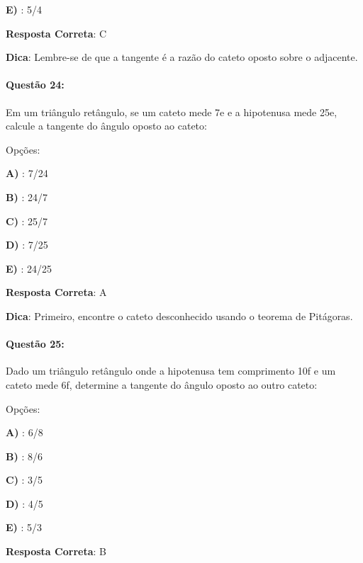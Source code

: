 \documentclass{article}
\begin{document}
\textbf{E) }: 5/4 

\vspace{\baselineskip}\textbf{Resposta Correta}: C

\vspace{\baselineskip}\textbf{Dica}: Lembre-se de que a tangente é a razão do cateto oposto sobre o adjacente.

\paragraph{Questão 24:}
{Em um triângulo retângulo, se um cateto mede 7e e a hipotenusa mede 25e, calcule a tangente do ângulo oposto ao cateto:}

\vspace{\baselineskip}Opções:

\vspace{\baselineskip}\textbf{A) }: 7/24 

\textbf{B) }: 24/7 

\textbf{C) }: 25/7 

\textbf{D) }: 7/25 

\textbf{E) }: 24/25 

\vspace{\baselineskip}\textbf{Resposta Correta}: A

\vspace{\baselineskip}\textbf{Dica}: Primeiro, encontre o cateto desconhecido usando o teorema de Pitágoras.

\paragraph{Questão 25:}
{Dado um triângulo retângulo onde a hipotenusa tem comprimento 10f e um cateto mede 6f, determine a tangente do ângulo oposto ao outro cateto:}

\vspace{\baselineskip}Opções:

\vspace{\baselineskip}\textbf{A) }: 6/8 

\textbf{B) }: 8/6 

\textbf{C) }: 3/5 

\textbf{D) }: 4/5 

\textbf{E) }: 5/3 

\vspace{\baselineskip}\textbf{Resposta Correta}: B
\end{document}
